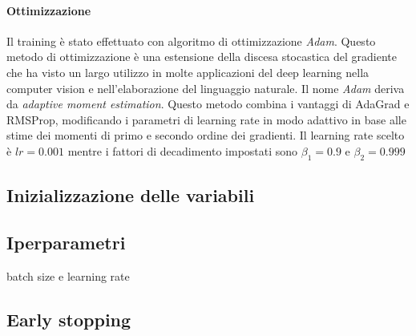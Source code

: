 \paragraph{Ottimizzazione} Il training è stato effettuato con algoritmo di ottimizzazione \textit{Adam}. Questo metodo di ottimizzazione è una estensione della discesa stocastica del gradiente che ha visto un largo utilizzo in molte applicazioni del deep learning nella computer vision e nell'elaborazione del linguaggio naturale. Il nome \textit{Adam} deriva da \textit{adaptive moment estimation}. Questo metodo combina i vantaggi di AdaGrad e RMSProp, modificando i parametri di learning rate in modo adattivo in base alle stime dei momenti di primo e secondo ordine dei gradienti. Il learning rate scelto è $lr=0.001$ mentre i fattori di decadimento impostati sono $\beta_1=0.9$ e $\beta_2=0.999$

\subsection{Inizializzazione delle variabili}
\subsection{Iperparametri}
batch size e learning rate
\subsection{Early stopping}
